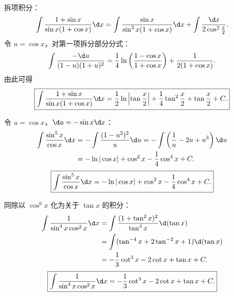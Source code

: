 \begin{solution}

    拆项积分：
    \begin{equation}
        \int \frac{1 + \sin x}{\sin x(1 + \cos x)} \d x = \int \frac{\sin x}{\sin^2 x(1 + \cos x)} \d x + \int \frac{\d x}{2\cos^2\frac{x}{2}}.
    \end{equation}
    令 $u = \cos x$，对第一项拆分部分分式：
    \begin{equation}
        \int \frac{-\d u}{(1 - u)(1 + u)^2} = \frac{1}{4}\ln\left( \frac{1 - \cos x}{1 + \cos x} \right) + \frac{1}{2(1 + \cos x)}.
    \end{equation}
    由此可得
    \begin{equation}
        \boxed{\int \frac{1 + \sin x}{\sin x(1 + \cos x)} \d x = \frac{1}{2}\ln\left|\tan\frac{x}{2}\right| + \frac{1}{4}\tan^2\frac{x}{2} + \tan\frac{x}{2} + C.}
    \end{equation}


    令 $u = \cos x$，$\d u = -\sin x \d x$：
    \begin{equation}
        \begin{aligned}
            \int \frac{\sin^5 x}{\cos x} \d x & = -\int \frac{(1 - u^2)^2}{u} \d u = -\int \left( \frac{1}{u} - 2u + u^3 \right) \d u \\
                                              & = -\ln|\cos x| + \cos^2 x - \frac{1}{4}\cos^4 x + C.
        \end{aligned}
    \end{equation}
    \begin{equation}
        \boxed{\int \frac{\sin^5 x}{\cos x} \d x = -\ln|\cos x| + \cos^2 x - \frac{1}{4}\cos^4 x + C.}
    \end{equation}


    同除以 $\cos^6 x$ 化为关于 $\tan x$ 的积分：
    \begin{equation}
        \begin{aligned}
            \int \frac{1}{\sin^4 x \cos^2 x} \d x & = \int \frac{(1 + \tan^2 x)^2}{\tan^4 x} \d(\tan x) \\
                                                  & = \int (\tan^{-4} x + 2\tan^{-2} x + 1) \d(\tan x)  \\
                                                  & = -\frac{1}{3}\cot^3 x - 2\cot x + \tan x + C.
        \end{aligned}
    \end{equation}
    \begin{equation}
        \boxed{\int \frac{1}{\sin^4 x \cos^2 x} \d x = -\frac{1}{3}\cot^3 x - 2\cot x + \tan x + C.}
    \end{equation}


\end{solution}
